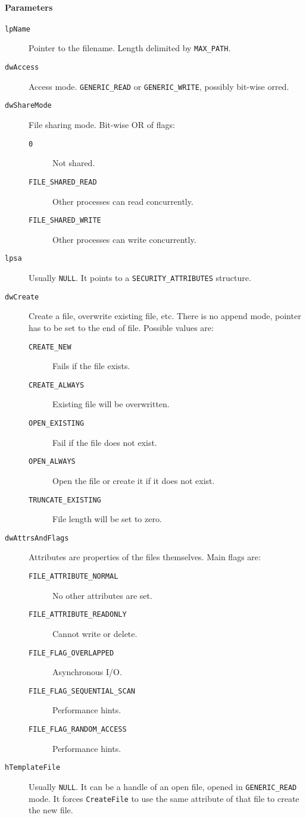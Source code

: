 \paragraph{Parameters}
\begin{description}
\item [\texttt{lpName}] Pointer to the filename. Length delimited by \texttt{MAX\_PATH}.
\item [\texttt{dwAccess}] Access mode. \texttt{GENERIC\_READ} or \texttt{GENERIC\_WRITE}, possibly bit-wise orred.
\item [\texttt{dwShareMode}] File sharing mode. Bit-wise OR of flags:
\begin{description}
\item [\texttt{0}] Not shared.
\item [\texttt{FILE\_SHARED\_READ}] Other processes can read concurrently.
\item [\texttt{FILE\_SHARED\_WRITE}] Other processes can write concurrently.
\end{description}
\item [\texttt{lpsa}] Usually \texttt{NULL}. It points to a \texttt{SECURITY\_ATTRIBUTES} structure.
\item [\texttt{dwCreate}] Create a file, overwrite existing file, etc. There is no append mode, pointer has to be set to the end of file. Possible values are:
\begin{description}
\item [\texttt{CREATE\_NEW}] Fails if the file exists.
\item [\texttt{CREATE\_ALWAYS}] Existing file will be overwritten.
\item [\texttt{OPEN\_EXISTING}] Fail if the file does not exist.
\item [\texttt{OPEN\_ALWAYS}] Open the file or create it if it does not exist.
\item [\texttt{TRUNCATE\_EXISTING}] File length will be set to zero.
\end{description}
\item [\texttt{dwAttrsAndFlags}] Attributes are properties of the files themselves. Main flags are:
\begin{description}
\item [\texttt{FILE\_ATTRIBUTE\_NORMAL}] No other attributes are set.
\item [\texttt{FILE\_ATTRIBUTE\_READONLY}] Cannot write or delete.
\item [\texttt{FILE\_FLAG\_OVERLAPPED}] Asynchronous I/O.
\item [\texttt{FILE\_FLAG\_SEQUENTIAL\_SCAN}] Performance hints.
\item [\texttt{FILE\_FLAG\_RANDOM\_ACCESS}] Performance hints.
\end{description}
\item [\texttt{hTemplateFile}] Usually \texttt{NULL}. It can be a handle of an open file, opened in \texttt{GENERIC\_READ} mode. It forces \texttt{CreateFile} to use the same attribute of that file to create the new file.
\end{description}

